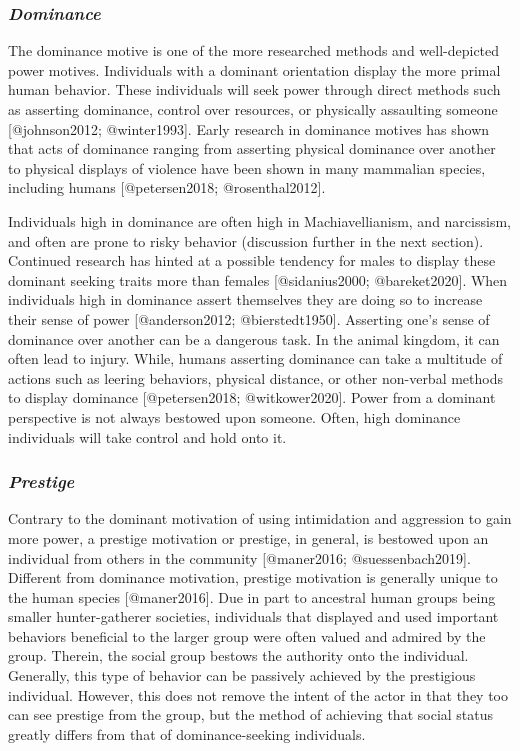 \documentclass[
]{article}
\begin{document}
\hypertarget{dominance}{%
\subsubsection{\texorpdfstring{\emph{Dominance}}{Dominance}}\label{dominance}}

The dominance motive is one of the more researched methods and
well-depicted power motives. Individuals with a dominant orientation
display the more primal human behavior. These individuals will seek
power through direct methods such as asserting dominance, control over
resources, or physically assaulting someone {[}@johnson2012;
@winter1993{]}. Early research in dominance motives has shown that acts
of dominance ranging from asserting physical dominance over another to
physical displays of violence have been shown in many mammalian species,
including humans {[}@petersen2018; @rosenthal2012{]}.

Individuals high in dominance are often high in Machiavellianism, and
narcissism, and often are prone to risky behavior (discussion further in
the next section). Continued research has hinted at a possible tendency
for males to display these dominant seeking traits more than females
{[}@sidanius2000; @bareket2020{]}. When individuals high in dominance
assert themselves they are doing so to increase their sense of power
{[}@anderson2012; @bierstedt1950{]}. Asserting one's sense of dominance
over another can be a dangerous task. In the animal kingdom, it can
often lead to injury. While, humans asserting dominance can take a
multitude of actions such as leering behaviors, physical distance, or
other non-verbal methods to display dominance {[}@petersen2018;
@witkower2020{]}. Power from a dominant perspective is not always
bestowed upon someone. Often, high dominance individuals will take
control and hold onto it.

\hypertarget{prestige}{%
\subsubsection{\texorpdfstring{\emph{Prestige}}{Prestige}}\label{prestige}}

Contrary to the dominant motivation of using intimidation and aggression
to gain more power, a prestige motivation or prestige, in general, is
bestowed upon an individual from others in the community {[}@maner2016;
@suessenbach2019{]}. Different from dominance motivation, prestige
motivation is generally unique to the human species {[}@maner2016{]}.
Due in part to ancestral human groups being smaller hunter-gatherer
societies, individuals that displayed and used important behaviors
beneficial to the larger group were often valued and admired by the
group. Therein, the social group bestows the authority onto the
individual. Generally, this type of behavior can be passively achieved
by the prestigious individual. However, this does not remove the intent
of the actor in that they too can see prestige from the group, but the
method of achieving that social status greatly differs from that of
dominance-seeking individuals.
\end{document}
